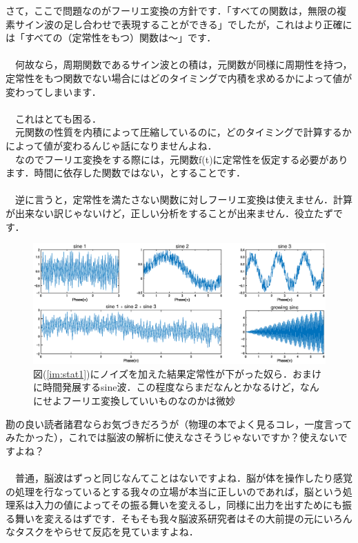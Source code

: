 \documentclass[11pt,a4paper]{ujreport} 	%
\begin{document}
さて，ここで問題なのがフーリエ変換の方針です．「すべての関数は，無限の複素サイン波の足し合わせで表現することができる」でしたが，これはより正確には「すべての（定常性をもつ）関数は〜」です．\\ \\
　何故なら，周期関数であるサイン波との積は，元関数が同様に周期性を持つ，定常性をもつ関数でない場合にはどのタイミングで内積を求めるかによって値が変わってしまいます．\\
\\ 
　これはとても困る．\\
　元関数の性質を内積によって圧縮しているのに，どのタイミングで計算するかによって値が変わるんじゃ話になりませんよね．\\
　なのでフーリエ変換をする際には，元関数f(t)に定常性を仮定する必要があります．時間に依存した関数ではない，とすることです．\\
\\
　逆に言うと，定常性を満たさない関数に対しフーリエ変換は使えません．計算が出来ない訳じゃないけど，正しい分析をすることが出来ません．役立たずです．\\

\begin{figure}[H]
  \centering
  \includegraphics[width=15cm]{../figures/stationarity2.eps}
  \caption{図(\ref{im:stat1})にノイズを加えた結果定常性が下がった奴ら．おまけに時間発展するsine波．この程度ならまだなんとかなるけど，なんにせよフーリエ変換していいものなのかは微妙}
\end{figure}

勘の良い読者諸君ならお気づきだろうが（物理の本でよく見るコレ，一度言ってみたかった），これでは脳波の解析に使えなさそうじゃないですか？使えないですよね？\\
\\
　普通，脳波はずっと同じなんてことはないですよね．脳が体を操作したり感覚の処理を行なっているとする我々の立場が本当に正しいのであれば，脳という処理系は入力の値によってその振る舞いを変えるし，同様に出力を出すためにも振る舞いを変えるはずです．そもそも我々脳波系研究者はその大前提の元にいろんなタスクをやらせて反応を見ていますよね．
\end{document}
